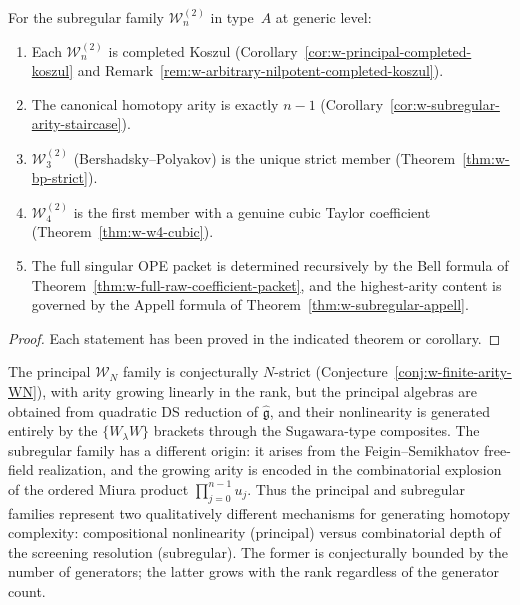 \begin{theorem}
\label{thm:w-subregular-classification}
For the subregular family $\mathcal{W}_n^{(2)}$ in type~$A$ at
generic level:
\begin{enumerate}[label=\textup{(\roman*)}]
\item Each $\mathcal{W}_n^{(2)}$ is completed Koszul
(Corollary~\ref{cor:w-principal-completed-koszul} and
Remark~\ref{rem:w-arbitrary-nilpotent-completed-koszul}).

\item The canonical homotopy arity is exactly $n-1$
(Corollary~\ref{cor:w-subregular-arity-staircase}).

\item $\mathcal{W}_3^{(2)}$ (Bershadsky--Polyakov) is the unique
strict member (Theorem~\ref{thm:w-bp-strict}).

\item $\mathcal{W}_4^{(2)}$ is the first member with a genuine
cubic Taylor coefficient
(Theorem~\ref{thm:w-w4-cubic}).

\item The full singular OPE packet is determined recursively by the
Bell formula of Theorem~\ref{thm:w-full-raw-coefficient-packet}, and
the highest-arity content is governed by the Appell formula of
Theorem~\ref{thm:w-subregular-appell}.
\end{enumerate}
\end{theorem}

\begin{proof}
Each statement has been proved in the indicated theorem or corollary.
\end{proof}

\begin{remark}
\label{rem:w-subregular-vs-principal}
The principal $\mathcal{W}_N$ family is conjecturally $N$-strict
(Conjecture~\ref{conj:w-finite-arity-WN}), with arity growing
linearly in the rank, but the principal algebras are obtained from
quadratic DS reduction of $\widehat{\mathfrak{g}}$, and their
nonlinearity is generated entirely by the $\{W_\lambda W\}$ brackets
through the Sugawara-type composites.  The subregular family has a
different origin: it arises from the Feigin--Semikhatov
free-field realization, and the growing arity is encoded in the
combinatorial explosion of the ordered Miura product
$\prod_{j=0}^{n-1} u_j$.  Thus the principal and subregular families
represent two qualitatively different mechanisms for generating
homotopy complexity: compositional nonlinearity (principal) versus
combinatorial depth of the screening resolution (subregular).  The
former is conjecturally bounded by the number of generators; the
latter grows with the rank regardless of the generator count.
\end{remark}

